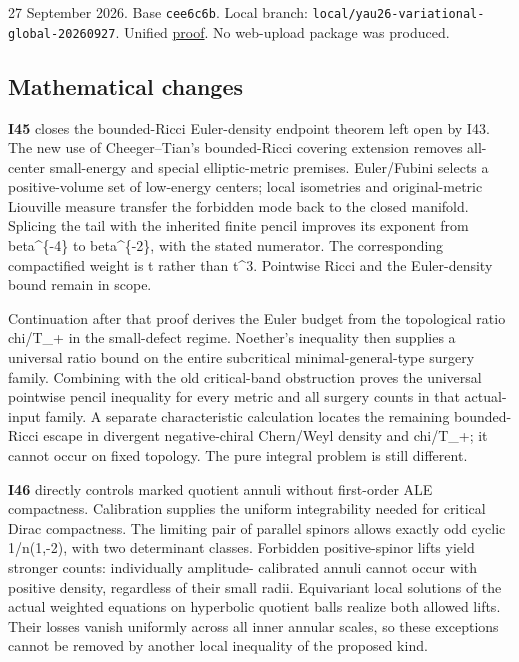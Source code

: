 \documentclass[
  10pt,
]{article}
\begin{document}
27 September 2026. Base \texttt{cee6c6b}. Local branch:
\texttt{local/yau26-variational-global-20260927}. Unified
\href{../continuation/20260927_local_geometry_and_variational_extrema.md}{proof}.
No web-upload package was produced.

\hypertarget{mathematical-changes-1}{%
\subsection{Mathematical changes}\label{mathematical-changes-1}}

\textbf{I45} closes the bounded-Ricci Euler-density endpoint theorem
left open by I43. The new use of Cheeger--Tian's bounded-Ricci covering
extension removes all-center small-energy and special elliptic-metric
premises. Euler/Fubini selects a positive-volume set of low-energy
centers; local isometries and original-metric Liouville measure transfer
the forbidden mode back to the closed manifold. Splicing the tail with
the inherited finite pencil improves its exponent from beta\^{}\{-4\} to
beta\^{}\{-2\}, with the stated numerator. The corresponding
compactified weight is t rather than t\^{}3. Pointwise Ricci and the
Euler-density bound remain in scope.

Continuation after that proof derives the Euler budget from the
topological ratio chi/T\_+ in the small-defect regime. Noether's
inequality then supplies a universal ratio bound on the entire
subcritical minimal-general-type surgery family. Combining with the old
critical-band obstruction proves the universal pointwise pencil
inequality for every metric and all surgery counts in that actual-input
family. A separate characteristic calculation locates the remaining
bounded-Ricci escape in divergent negative-chiral Chern/Weyl density and
chi/T\_+; it cannot occur on fixed topology. The pure integral problem
is still different.

\textbf{I46} directly controls marked quotient annuli without
first-order ALE compactness. Calibration supplies the uniform
integrability needed for critical Dirac compactness. The limiting pair
of parallel spinors allows exactly odd cyclic 1/n(1,-2), with two
determinant classes. Forbidden positive-spinor lifts yield stronger
counts: individually amplitude- calibrated annuli cannot occur with
positive density, regardless of their small radii. Equivariant local
solutions of the actual weighted equations on hyperbolic quotient balls
realize both allowed lifts. Their losses vanish uniformly across all
inner annular scales, so these exceptions cannot be removed by another
local inequality of the proposed kind.
\end{document}
